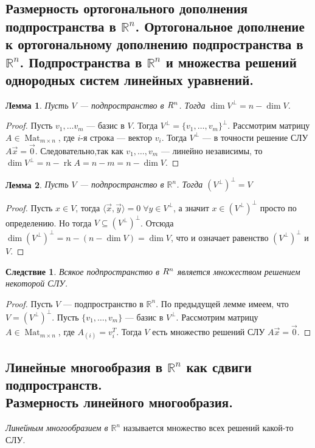 \documentclass[a4paper, 12pt]{article}
\DeclareMathOperator{\Mat}{Mat}
\DeclareMathOperator{\rk}{rk}
\newtheorem*{lemma}{Лемма}
\newtheorem*{base_44-cons}{Следствие}
\newcommand{\bbR}[0]{\mathbb{R}}
\begin{document}
\subsection{Размерность ортогонального дополнения подпространства в $\mathbb{R}^n$. Ортогональное дополнение к ортогональному дополнению подпространства в $\mathbb{R}^n$. Подпространства в $\mathbb{R}^n$ и множества решений однородных систем линейных уравнений.}
\begin{lemma}
Пусть $V$ --- подпространство в $\mathbb \bbR^n$. Тогда $\dim V^{\perp} = n - \dim V$. 
\end{lemma}
\begin{proof}
Пусть $v_1, \ldots v_m$ --- базис в $V$. Тогда $V^{\perp} = \{v_1, \ldots, v_m\}^{\perp}$. Рассмотрим матрицу $A \in \Mat_{m \times n}$, где $i$-я строка --- вектор $v_i$. Тогда $V^{\perp}$ --- в точности решение СЛУ $A\vec{x} = \vec{0}$. Следовательно,так как $v_1, \dots, v_m$ --- линейно независимы, то $\dim V^{\perp} = n - \rk A = n - m = n - \dim V$. 
\end{proof}
\begin{lemma}
Пусть $V$ --- подпространство в $\mathbb{R}^n$. Тогда $\left(V^{\perp}\right)^{\perp} = V$
\end{lemma}
\begin{proof}
Пусть $x \in V$, тогда $\langle \vec{x},\vec{y} \rangle = 0\; \forall y \in V^{\perp}$, а значит $x \in \left(V^{\perp}\right)^{\perp}$ просто по определению. Но тогда $V \subseteq \left(V^{\perp}\right)^{\perp}$. Отсюда $\dim \left(V^{\perp}\right)^{\perp} = n - (n - \dim V) = \dim V$, что и означает равенство $\left(V^{\perp}\right)^{\perp}$ и $V$.
\end{proof}
\begin{base_44-cons}
Всякое подпространство в $\mathbb \bbR^n$ является множеством решением некоторой СЛУ.
\end{base_44-cons}
\begin{proof}
Пусть $V$ --- подпространство в $\mathbb{R}^n$. По предыдущей лемме имеем, что $V = \left( V^{\perp} \right)^{\perp}$. Пусть $\{v_1, \ldots, v_m\}$ --- базис в $V^{\perp}$. Рассмотрим матрицу $A \in \Mat_{m \times n} $, где $A_{(i)} = v_i^T$. Тогда $V$ есть множество решений СЛУ $A\vec{x} = \vec{0}$.
\end{proof}

\subsection{Линейные многообразия в $\mathbb{R}^n$ как сдвиги подпространств.\\ Размерность линейного многообразия.}
\textit{Линейным многообразием в $\mathbb{R}^n$} называется множество всех решений какой-то СЛУ.
\end{document}
